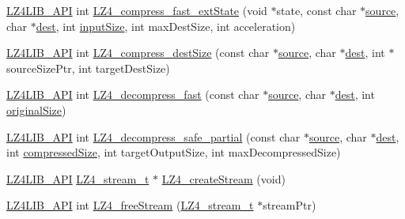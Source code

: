 \begin{DoxyCompactItemize}
\item 
\hyperlink{compat-lz4_8h_a00a61e1435005f8a621edf4bbe0ef844}{L\+Z4\+L\+I\+B\+\_\+\+A\+P\+I} int \hyperlink{compat-lz4_8h_adf10cb9dd113049e97bdc3ee5ce7b6ed}{L\+Z4\+\_\+compress\+\_\+fast\+\_\+ext\+State} (void $\ast$state, const char $\ast$\hyperlink{compat-lz4_8h_a0211201f992ec3f0b641c9ceff5f837a}{source}, char $\ast$\hyperlink{compat-lz4_8h_accb93c5987f80eedf1f5da3cfa1c0d22}{dest}, int \hyperlink{compat-lz4_8h_a8f274f682cf5ca365dd560d994011541}{input\+Size}, int max\+Dest\+Size, int acceleration)
\item 
\hyperlink{compat-lz4_8h_a00a61e1435005f8a621edf4bbe0ef844}{L\+Z4\+L\+I\+B\+\_\+\+A\+P\+I} int \hyperlink{compat-lz4_8h_ae240d134add3f1721057b5c14e3bc82c}{L\+Z4\+\_\+compress\+\_\+dest\+Size} (const char $\ast$\hyperlink{compat-lz4_8h_a0211201f992ec3f0b641c9ceff5f837a}{source}, char $\ast$\hyperlink{compat-lz4_8h_accb93c5987f80eedf1f5da3cfa1c0d22}{dest}, int $\ast$source\+Size\+Ptr, int target\+Dest\+Size)
\item 
\hyperlink{compat-lz4_8h_a00a61e1435005f8a621edf4bbe0ef844}{L\+Z4\+L\+I\+B\+\_\+\+A\+P\+I} int \hyperlink{compat-lz4_8h_ae35b8223a2126106ca22b79577dddd21}{L\+Z4\+\_\+decompress\+\_\+fast} (const char $\ast$\hyperlink{compat-lz4_8h_a0211201f992ec3f0b641c9ceff5f837a}{source}, char $\ast$\hyperlink{compat-lz4_8h_accb93c5987f80eedf1f5da3cfa1c0d22}{dest}, int \hyperlink{compat-lz4_8h_acb72249f2d22c1084adf0de0406d6c3d}{original\+Size})
\item 
\hyperlink{compat-lz4_8h_a00a61e1435005f8a621edf4bbe0ef844}{L\+Z4\+L\+I\+B\+\_\+\+A\+P\+I} int \hyperlink{compat-lz4_8h_acba496eb465f339989dc3d8a3bb7d41e}{L\+Z4\+\_\+decompress\+\_\+safe\+\_\+partial} (const char $\ast$\hyperlink{compat-lz4_8h_a0211201f992ec3f0b641c9ceff5f837a}{source}, char $\ast$\hyperlink{compat-lz4_8h_accb93c5987f80eedf1f5da3cfa1c0d22}{dest}, int \hyperlink{compat-lz4_8h_a0f9a0600771a3eb50c56e55266a7da49}{compressed\+Size}, int target\+Output\+Size, int max\+Decompressed\+Size)
\item 
\hyperlink{compat-lz4_8h_a00a61e1435005f8a621edf4bbe0ef844}{L\+Z4\+L\+I\+B\+\_\+\+A\+P\+I} \hyperlink{compat-lz4_8h_a4fb9ac4ce6d5e25edc9188f9d6633498}{L\+Z4\+\_\+stream\+\_\+t} $\ast$ \hyperlink{compat-lz4_8h_ae2f3cdde265f5abde4c1299bcdfbe5b8}{L\+Z4\+\_\+create\+Stream} (void)
\item 
\hyperlink{compat-lz4_8h_a00a61e1435005f8a621edf4bbe0ef844}{L\+Z4\+L\+I\+B\+\_\+\+A\+P\+I} int \hyperlink{compat-lz4_8h_a820a8fea119332103a839f27c14beb22}{L\+Z4\+\_\+free\+Stream} (\hyperlink{compat-lz4_8h_a4fb9ac4ce6d5e25edc9188f9d6633498}{L\+Z4\+\_\+stream\+\_\+t} $\ast$stream\+Ptr)

\end{DoxyCompactItemize}
